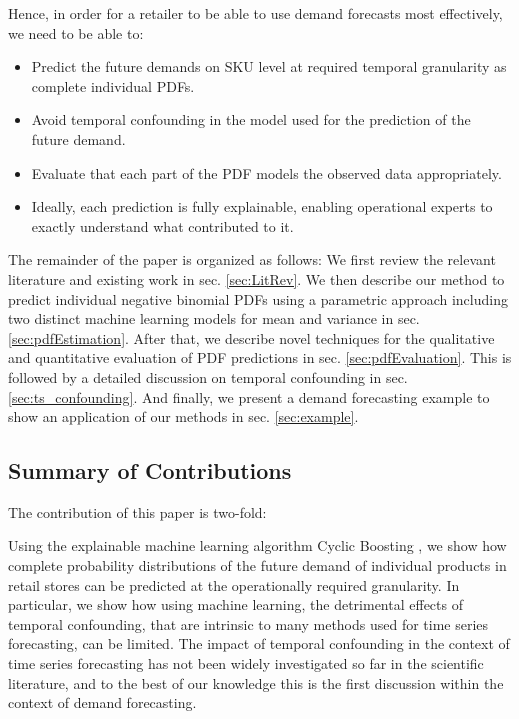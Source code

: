 \documentclass[BCOR=1mm, DIV=calc,10pt,
twoside=true,
twocolumn,
headings=normal]{scrartcl}
\begin{document}
Hence, in order for a retailer to be able to use demand forecasts most effectively, we need to be able to:
\begin{itemize}
	\item {Predict the future demands on SKU level at required temporal granularity as complete individual PDFs.}
	\item {Avoid temporal confounding in the model used for the prediction of the future demand.}
	\item {Evaluate that each part of the PDF models the observed data appropriately.}
	\item {Ideally, each prediction is fully explainable, enabling operational experts to exactly understand what contributed to it.}
\end{itemize}

The remainder of the paper is organized as follows: We first review the relevant literature and existing work in sec. \ref{sec:LitRev}. We then describe our method to predict individual negative binomial PDFs using  a parametric approach including two distinct machine learning models for mean and variance in sec. \ref{sec:pdfEstimation}. After that, we describe novel techniques for the qualitative and quantitative evaluation of PDF predictions in sec. \ref{sec:pdfEvaluation}. This is followed by a detailed discussion on temporal confounding in sec. \ref{sec:ts_confounding}. And finally, we present a demand forecasting example to show an application of our methods in sec. \ref{sec:example}.

\subsection*{Summary of Contributions}

The contribution of this paper is two-fold:

Using the explainable machine learning algorithm Cyclic Boosting \cite{Wick2019}, we show how complete probability distributions of the future demand of individual products in retail stores can be predicted at the operationally required granularity. In particular, we show how using machine learning, the detrimental effects of temporal confounding, that are intrinsic to many methods used for time series forecasting, can be limited. The impact of temporal confounding in the context of time series forecasting has not been widely investigated so far in the scientific literature, and to the best of our knowledge this is the first discussion within the context of demand forecasting.
\end{document}
